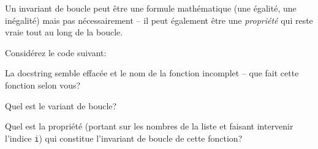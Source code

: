 \documentclass[12pt]{article}
\begin{document}
	Un invariant de boucle peut être une formule mathématique (une égalité, une inégalité) mais pas nécessairement -- il peut également être une \textit{propriété} qui reste vraie tout au long de la boucle. 
	
	\begin{MonExo}
		Considérez le code suivant:
		
		\begin{alphenum}
			\item La docstring semble effacée et le nom de la fonction incomplet -- que fait cette fonction selon vous?
			\item Quel est le variant de boucle?
			\item Quel est la propriété (portant sur les nombres de la liste et faisant intervenir l'indice \texttt{i}) qui constitue l'invariant de boucle de cette fonction?
		\end{alphenum}
	\end{MonExo}
	
\end{document}
